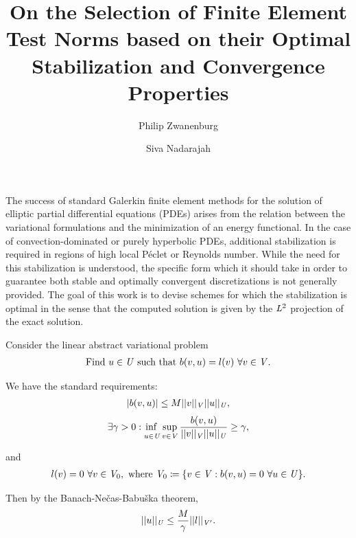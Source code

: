 \documentclass[]{article}
\begin{document}
\title{On the Selection of Finite Element Test Norms based on their Optimal Stabilization and Convergence Properties}
\author{
Philip Zwanenburg \and
Siva Nadarajah
}

\maketitle

The success of standard Galerkin finite element methods for the solution of
elliptic partial differential equations (PDEs) arises from the relation between
the variational formulations and the minimization of an energy functional.
In the case of convection-dominated or purely hyperbolic PDEs, additional
stabilization is required in regions of high local P\'eclet or Reynolds number.
While the need for this stabilization is understood, the specific form which it
should take in order to guarantee both stable and optimally convergent
discretizations is not generally provided.
The goal of this work is to devise schemes for which the stabilization is
optimal in the sense that the computed solution is given by the $\mathit{{{L}}}^2$ projection of
the exact solution.

Consider the linear abstract variational problem
\begin{align} \label{eq:bilinear_abstract_infinite}
\text{Find}\ u \in \mathit{{{U}}}\ \text{such that}\
b(v,u) = l(v)\ \forall v \in \mathit{{{V}}}.
\end{align}

We have the standard requirements:
\begin{align}
| b(v,u) | \le M
||v||_{\mathit{{{V}}}}
||u||_{\mathit{{{U}}}},
\end{align}
\begin{align} \label{eq:inf_sup_infinite}
\exists \gamma > 0 :
\adjustlimits\inf_{u\in\fspace{U}} \sup_{v\in\fspace{V}}
\frac{b(v,u)}{||v||_{\fspace{V}}||u||_{\fspace{U}}} \ge \gamma,
\end{align}

and
\begin{align}
l(v) = 0\ \forall v \in \mathit{{{V}}}_0,\ \text{where}\ \mathit{{{V}}}_0 \coloneqq \{v \in \mathit{{{V}}} : b(v,u) = 0\ \forall u
\in \mathit{{{U}}} \}.
\end{align}

Then by the Banach-Ne\v{c}as-Babu\v{s}ka theorem,
\begin{align}
||u||_{\mathit{{{U}}}} \le \frac{M}{\gamma} ||l||_{\mathit{{{V}}}'}.
\end{align}
\end{document}
